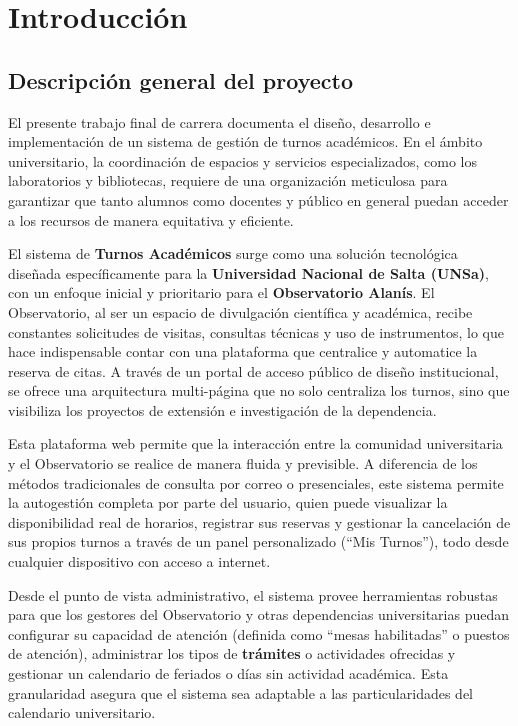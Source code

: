 \chapter{Introducción}

\section{Descripción general del proyecto}
El presente trabajo final de carrera documenta el diseño, desarrollo e implementación de un sistema de gestión de turnos académicos. En el ámbito universitario, la coordinación de espacios y servicios especializados, como los laboratorios y bibliotecas, requiere de una organización meticulosa para garantizar que tanto alumnos como docentes y público en general puedan acceder a los recursos de manera equitativa y eficiente.

El sistema de \textbf{Turnos Académicos} surge como una solución tecnológica diseñada específicamente para la \textbf{Universidad Nacional de Salta (UNSa)}, con un enfoque inicial y prioritario para el \textbf{Observatorio Alanís}. El Observatorio, al ser un espacio de divulgación científica y académica, recibe constantes solicitudes de visitas, consultas técnicas y uso de instrumentos, lo que hace indispensable contar con una plataforma que centralice y automatice la reserva de citas. A través de un portal de acceso público de diseño institucional, se ofrece una arquitectura multi-página que no solo centraliza los turnos, sino que visibiliza los proyectos de extensión e investigación de la dependencia.

Esta plataforma web permite que la interacción entre la comunidad universitaria y el Observatorio se realice de manera fluida y previsible. A diferencia de los métodos tradicionales de consulta por correo o presenciales, este sistema permite la autogestión completa por parte del usuario, quien puede visualizar la disponibilidad real de horarios, registrar sus reservas y gestionar la cancelación de sus propios turnos a través de un panel personalizado (``Mis Turnos''), todo desde cualquier dispositivo con acceso a internet.

Desde el punto de vista administrativo, el sistema provee herramientas robustas para que los gestores del Observatorio y otras dependencias universitarias puedan configurar su capacidad de atención (definida como ``mesas habilitadas'' o puestos de atención), administrar los tipos de \textbf{trámites} o actividades ofrecidas y gestionar un calendario de feriados o días sin actividad académica. Esta granularidad asegura que el sistema sea adaptable a las particularidades del calendario universitario.

